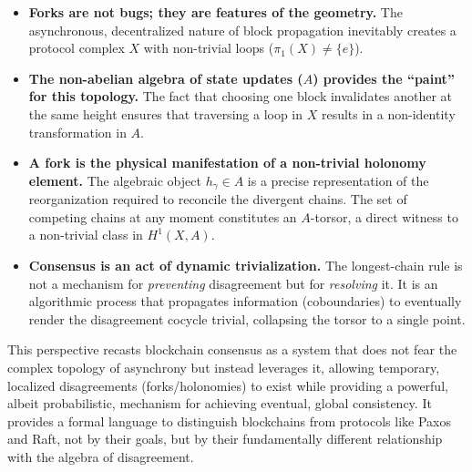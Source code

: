 \documentclass[
]{article}
\providecommand{\tightlist}{%
  \setlength{\itemsep}{0pt}\setlength{\parskip}{0pt}}
\begin{document}
\begin{itemize}
\tightlist
\item
  \textbf{Forks are not bugs; they are features of the geometry.} The
  asynchronous, decentralized nature of block propagation inevitably
  creates a protocol complex \(X\) with non-trivial loops
  (\(\pi_1(X) \neq \{e\}\)).
\item
  \textbf{The non-abelian algebra of state updates (\(A\)) provides the
  ``paint'' for this topology.} The fact that choosing one block
  invalidates another at the same height ensures that traversing a loop
  in \(X\) results in a non-identity transformation in \(A\).
\item
  \textbf{A fork is the physical manifestation of a non-trivial holonomy
  element.} The algebraic object \(h_\gamma \in A\) is a precise
  representation of the reorganization required to reconcile the
  divergent chains. The set of competing chains at any moment
  constitutes an \(A\)-torsor, a direct witness to a non-trivial class
  in \(H^1(X, A)\).
\item
  \textbf{Consensus is an act of dynamic trivialization.} The
  longest-chain rule is not a mechanism for \emph{preventing}
  disagreement but for \emph{resolving} it. It is an algorithmic process
  that propagates information (coboundaries) to eventually render the
  disagreement cocycle trivial, collapsing the torsor to a single point.
\end{itemize}

This perspective recasts blockchain consensus as a system that does not
fear the complex topology of asynchrony but instead leverages it,
allowing temporary, localized disagreements (forks/holonomies) to exist
while providing a powerful, albeit probabilistic, mechanism for
achieving eventual, global consistency. It provides a formal language to
distinguish blockchains from protocols like Paxos and Raft, not by their
goals, but by their fundamentally different relationship with the
algebra of disagreement.
\end{document}
